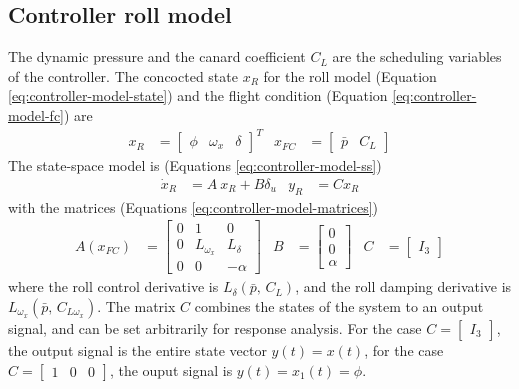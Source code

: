 \subsection{Controller roll model}
\label{sec:controller_model}
The dynamic pressure and the canard coefficient $C_L$ are the scheduling variables of the controller.
The concocted state $x_R$ for the roll model (Equation \ref{eq:controller-model-state}) and the flight condition (Equation \ref{eq:controller-model-fc}) are
\begin{align}
    x_R &= \begin{bmatrix} \phi & \omega_x & \delta \end{bmatrix}^T 
    & 
    x_{FC} &= \begin{bmatrix} \bar p & C_L \end{bmatrix}
    \nonumber
\end{align}
The state-space model is (Equations \ref{eq:controller-model-ss})
\begin{align}
    \dot x_R &= A \: x_R + B \delta_u 
    &
    y_R &= C x_R
    \nonumber
\end{align}
with the matrices (Equations \ref{eq:controller-model-matrices})
\begin{align}    
    A(x_{FC}) &= \begin{bmatrix}
        0 & 1 & 0 \\
        0 & L_{\omega_x} & L_\delta \\
        0 & 0 & -\alpha
    \end{bmatrix}
    &
    B &= \begin{bmatrix}
        0 \\ 0 \\ \alpha
    \end{bmatrix}
    &
    C &= \begin{bmatrix} I_3 \end{bmatrix}
    \nonumber
\end{align}
where the roll control derivative is $L_\delta (\bar p,  \,  C_L)$, and the roll damping derivative is $L_{\omega_x} (\bar p, \, C_{L \omega_x})$.
The matrix $C$ combines the states of the system to an output signal, and can be set arbitrarily for response analysis.
For the case $C = \begin{bmatrix} I_3 \end{bmatrix}$, the output signal is the entire state vector $y(t) = x(t)$, for the case $C = \begin{bmatrix} 1 & 0 & 0 \end{bmatrix}$, the ouput signal is $y(t) = x_1(t) = \phi$.

